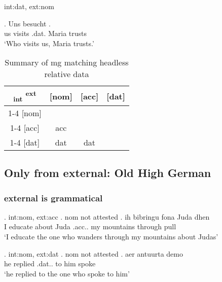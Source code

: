 \ac{int}:\ac{dat}, \ac{ext}:\ac{nom}

\exg. Uns besucht   .\\
 us visits\scsub{[nom]} .\ac{dat}. Maria trusts\scsub{[dat]}\\
 `Who visits us, Maria trusts.' 



 \begin{table}[H]
   \center
   \caption {Summary of \ac{mg} matching headless relative data}
 		\begin{tabular}{c|c|c|c}
 		  \toprule
 			\textsubscript{\ac{int}} \textsuperscript{\ac{ext}}
 		        & [\ac{nom}]
 		        & [\ac{acc}]
 		        & [\ac{dat}]
 		        \\ \cmidrule{1-4}
 		    [\ac{nom}]
 		        &
 		        &
 		        &
 		        \\ \cmidrule{1-4}
 		    [\ac{acc}]
 		        & \ac{acc}
 		        &
 		        &
 		        \\ \cmidrule{1-4}
 		    [\ac{dat}]
 		        & \ac{dat}
 		        & \ac{dat}
 		        &
 		        \\
 		  \bottomrule
 		\end{tabular}
 \end{table}


 \subsection{Only from external: Old High German}


  \subsubsection{external is grammatical}

 \ex. \ac{int}:\ac{nom}, \ac{ext}:\ac{acc}
 \a. \ac{nom} not attested
 \bg. ih bibringu fona Juda dhen   \\
  I educate\scsub{[acc]} about Juda .\ac{acc}.. my mountains {through pull}\scsub{[nom]}\\
  `I educate the one who wanders through my mountains about Judas' 

 \ex. \ac{int}:\ac{nom}, \ac{ext}:\ac{dat}
 \a. \ac{nom} not attested
 \bg. aer antuurta demo  \\
  he replied\scsub{[dat]} .\ac{dat}.. {to him} spoke\scsub{[nom]}\\
  `he replied to the one who spoke to him' 


